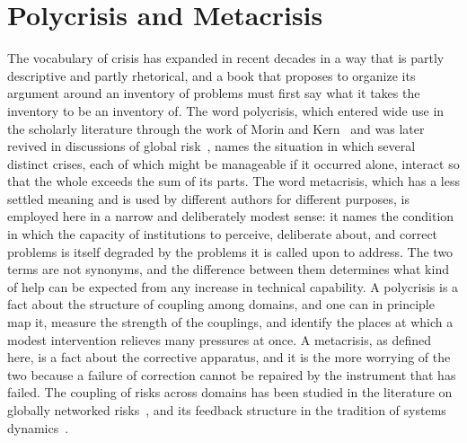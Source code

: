 \chapter{Polycrisis and Metacrisis}
\label{ch:03}

The vocabulary of crisis has expanded in recent decades in a way that is partly descriptive and partly rhetorical, and a book that proposes to organize its argument around an inventory of problems must first say what it takes the inventory to be an inventory of. The word polycrisis, which entered wide use in the scholarly literature through the work of Morin and Kern~\cite{morin1999} and was later revived in discussions of global risk~\cite{lawrence2022}, names the situation in which several distinct crises, each of which might be manageable if it occurred alone, interact so that the whole exceeds the sum of its parts. The word metacrisis, which has a less settled meaning and is used by different authors for different purposes, is employed here in a narrow and deliberately modest sense: it names the condition in which the capacity of institutions to perceive, deliberate about, and correct problems is itself degraded by the problems it is called upon to address. The two terms are not synonyms, and the difference between them determines what kind of help can be expected from any increase in technical capability. A polycrisis is a fact about the structure of coupling among domains, and one can in principle map it, measure the strength of the couplings, and identify the places at which a modest intervention relieves many pressures at once. A metacrisis, as defined here, is a fact about the corrective apparatus, and it is the more worrying of the two because a failure of correction cannot be repaired by the instrument that has failed. The coupling of risks across domains has been studied in the literature on globally networked risks~\cite{helbing2013}, and its feedback structure in the tradition of systems dynamics~\cite{meadows2008}.

